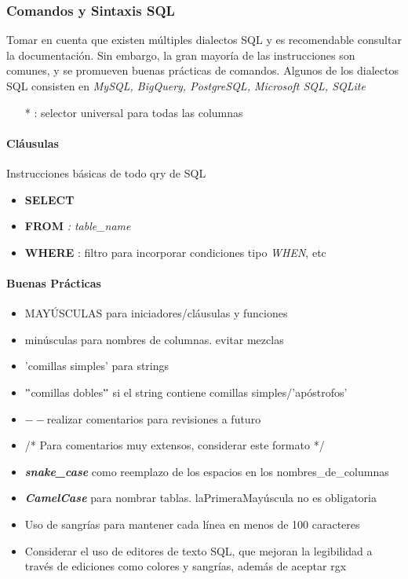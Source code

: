 \subsubsection{Comandos y Sintaxis SQL}
Tomar en cuenta que existen múltiples dialectos SQL y es recomendable consultar la documentación. Sin embargo, la gran mayoría de las instrucciones son comunes, y se promueven buenas prácticas de comandos. Algunos de los dialectos SQL consisten en \textit{MySQL, BigQuery, PostgreSQL, Microsoft SQL, SQLite}
\begin{itemize}
    \item [*]{ : selector universal para todas las columnas}
\end{itemize}

\paragraph{Cláusulas}
Instrucciones básicas de todo \gls{qry} de SQL
\begin{itemize}
    \item {\textbf{SELECT}}
    \item {\textbf{FROM}\textit{ : table\_name}}
    \item {\textbf{WHERE} : filtro para incorporar condiciones tipo \textit{WHEN}, etc}
\end{itemize}

\paragraph{Buenas Prácticas}
\begin{itemize}
    \item {MAYÚSCULAS para iniciadores/cláusulas y funciones}
    \item {minúsculas para nombres de columnas. evitar mezclas}
    \item {'comillas simples' para strings}
    \item {${"}$comillas dobles${"}$ si el string contiene comillas simples/'apóstrofos'}
    \item {${--}$realizar comentarios para revisiones a futuro}
    \item{/* Para comentarios muy extensos, considerar este formato */}
    \item {\textbf{\textit{snake\_case}} como reemplazo de los espacios en los nombres\_de\_columnas}
    \item {\textbf{\textit{CamelCase}} para nombrar tablas. laPrimeraMayúscula no es obligatoria}
    \item {Uso de sangrías para mantener cada línea en menos de 100 caracteres}
    \item {Considerar el uso de editores de texto SQL, que mejoran la legibilidad a través de ediciones como colores y sangrías, además de aceptar \gls{rgx}}
\end{itemize}

